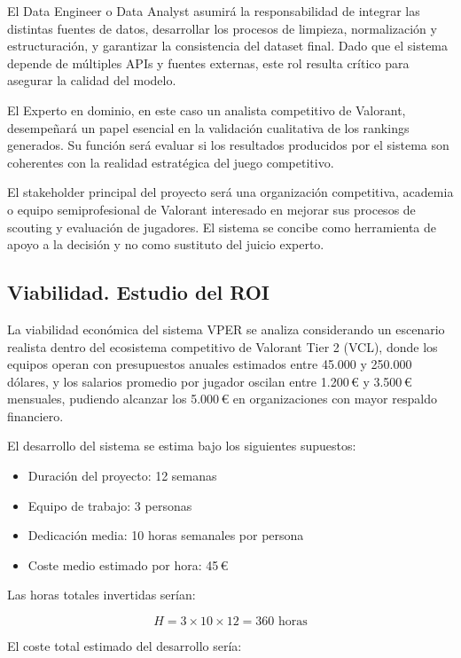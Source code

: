 \documentclass{ULBreport} %
\begin{document}
El Data Engineer o Data Analyst asumirá la responsabilidad de integrar las distintas fuentes de datos, desarrollar los procesos de limpieza, normalización y estructuración, y garantizar la consistencia del dataset final. Dado que el sistema depende de múltiples APIs y fuentes externas, este rol resulta crítico para asegurar la calidad del modelo.

El Experto en dominio, en este caso un analista competitivo de Valorant, desempeñará un papel esencial en la validación cualitativa de los rankings generados. Su función será evaluar si los resultados producidos por el sistema son coherentes con la realidad estratégica del juego competitivo.

El stakeholder principal del proyecto será una organización competitiva, academia o equipo semiprofesional de Valorant interesado en mejorar sus procesos de scouting y evaluación de jugadores. El sistema se concibe como herramienta de apoyo a la decisión y no como sustituto del juicio experto.

\subsection{Viabilidad. Estudio del ROI}

La viabilidad económica del sistema VPER se analiza considerando un escenario realista dentro del ecosistema competitivo de Valorant Tier 2 (VCL), donde los equipos operan con presupuestos anuales estimados entre 45.000 y 250.000 dólares, y los salarios promedio por jugador oscilan entre 1.200\,€ y 3.500\,€ mensuales, pudiendo alcanzar los 5.000\,€ en organizaciones con mayor respaldo financiero.

El desarrollo del sistema se estima bajo los siguientes supuestos:

\begin{itemize}
    \item Duración del proyecto: 12 semanas
    \item Equipo de trabajo: 3 personas
    \item Dedicación media: 10 horas semanales por persona
    \item Coste medio estimado por hora: 45\,€
\end{itemize}

Las horas totales invertidas serían:

\[
H = 3 \times 10 \times 12 = 360 \text{ horas}
\]

El coste total estimado del desarrollo sería:
\end{document}
